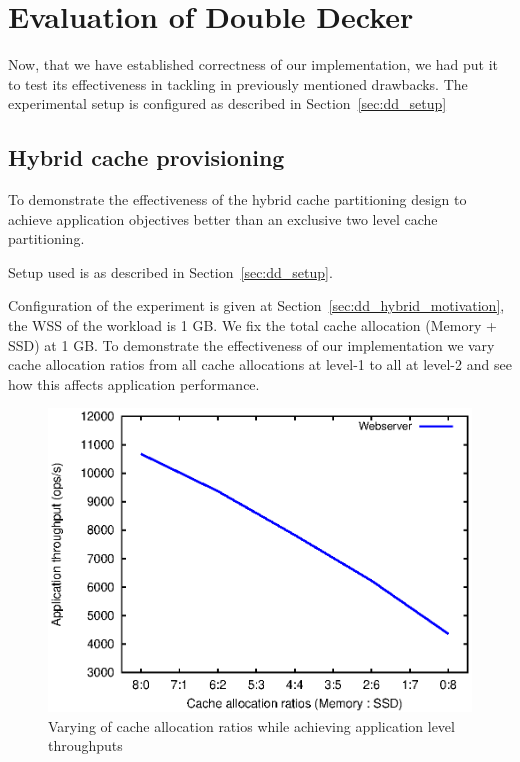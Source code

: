   
  
  \section{Evaluation of Double Decker}
    Now, that we have established correctness of our implementation, we had put it to test its effectiveness in 
    tackling in previously mentioned drawbacks. The experimental setup is configured as described in Section~\ref{sec:dd_setup}
    
  
    \subsection{Hybrid cache provisioning}
    
	To demonstrate the effectiveness of the hybrid cache partitioning design to achieve application objectives
	better than an exclusive two level cache partitioning.
	
	Setup used is as described in Section~\ref{sec:dd_setup}.
	
	Configuration of the experiment is given at Section~\ref{sec:dd_hybrid_motivation}, the WSS of the workload is
	1 GB. We fix the total cache allocation (Memory + SSD) at 1 GB.	To demonstrate the effectiveness of our 
	implementation we vary cache allocation ratios from all cache allocations at level-1 to all at level-2 and 
	see how this affects application performance.
	
	\begin{figure}
	  \centering
	  \includegraphics[scale=1]{images/dd_hybrid_eval/throughput.eps}
	  \caption{Varying of cache allocation ratios while achieving application level throughputs}
	  \label{plot:dd_sdc_results}
	\end{figure}
	
